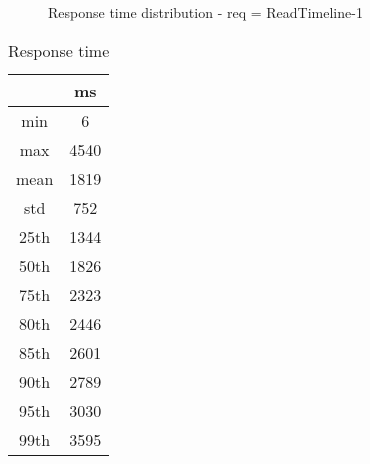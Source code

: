 \begin{minipage}{0.75\linewidth}
\begin{figure}[h]
\begin{adjustbox}{max width=1.0\linewidth, keepaspectratio}
  \end{adjustbox}
  \caption{Response time distribution - req = ReadTimeline-1}
\end{figure}
\end{minipage}\hfill\begin{minipage}{0.18\linewidth}
\begin{table}[h]
\begin{tabular}{|cc|}
\hline
\textbf{} & \textbf{ms}\\ \hline
 \Xhline{0.005\arrayrulewidth}
min & 6\\
 \Xhline{0.005\arrayrulewidth}
max & 4540\\
 \Xhline{0.005\arrayrulewidth}
mean & 1819\\
 \Xhline{0.005\arrayrulewidth}
std & 752\\
\hline
\hline
 \Xhline{0.005\arrayrulewidth}
25th & 1344\\
 \Xhline{0.005\arrayrulewidth}
50th & 1826\\
 \Xhline{0.005\arrayrulewidth}
75th & 2323\\
 \Xhline{0.005\arrayrulewidth}
80th & 2446\\
 \Xhline{0.005\arrayrulewidth}
85th & 2601\\
 \Xhline{0.005\arrayrulewidth}
90th & 2789\\
 \Xhline{0.005\arrayrulewidth}
95th & 3030\\
 \Xhline{0.005\arrayrulewidth}
99th & 3595\\
\hline
\end{tabular}
\caption{Response time}
\end{table}
\end{minipage}\hfill